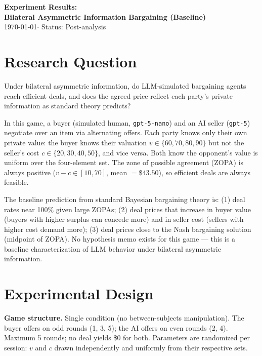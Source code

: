 \documentclass[11pt]{article}
\begin{document}
\begin{center}
{\Large \textbf{Experiment Results:\\Bilateral Asymmetric Information Bargaining (Baseline)}}\\[0.5em]
{\large \today \quad $\cdot$ \quad Status: Post-analysis}
\end{center}

\section*{Research Question}

Under bilateral asymmetric information, do LLM-simulated bargaining agents reach efficient deals, and does the agreed price reflect each party's private information as standard theory predicts?

In this game, a buyer (simulated human, \texttt{gpt-5-nano}) and an AI seller (\texttt{gpt-5}) negotiate over an item via alternating offers. Each party knows only their own private value: the buyer knows their valuation $v \in \{60, 70, 80, 90\}$ but not the seller's cost $c \in \{20, 30, 40, 50\}$, and vice versa. Both know the opponent's value is uniform over the four-element set. The zone of possible agreement (ZOPA) is always positive ($v - c \in [10, 70]$, mean $= \$43.50$), so efficient deals are always feasible.

The baseline prediction from standard Bayesian bargaining theory is: (1) deal rates near 100\% given large ZOPAs; (2) deal prices that increase in buyer value (buyers with higher surplus can concede more) and in seller cost (sellers with higher cost demand more); (3) deal prices close to the Nash bargaining solution (midpoint of ZOPA). No hypothesis memo exists for this game --- this is a baseline characterization of LLM behavior under bilateral asymmetric information.

\section*{Experimental Design}

\textbf{Game structure.} Single condition (no between-subjects manipulation). The buyer offers on odd rounds (1, 3, 5); the AI offers on even rounds (2, 4). Maximum 5 rounds; no deal yields \$0 for both. Parameters are randomized per session: $v$ and $c$ drawn independently and uniformly from their respective sets.
\end{document}
